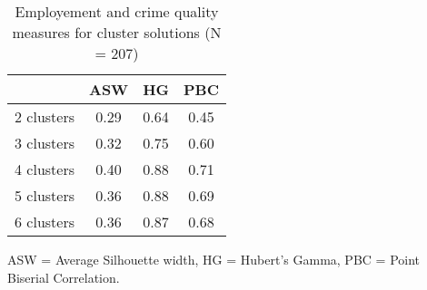 \begin{table}[htp]
\footnotesize
\setlength{\tabcolsep}{35pt}
\renewcommand{\arraystretch}{1.3}
\begin{threeparttable}
\centering
\caption{Employement and crime quality measures for cluster solutions (N = 207)} 
\label{tab:quality_clusters_job_crime}
\begin{tabular}{lccc}
  \hline
 & ASW & HG & PBC \\ 
  \hline
2 clusters & 0.29 & 0.64 & 0.45 \\ 
  3 clusters & 0.32 & 0.75 & 0.60 \\ 
  4 clusters & 0.40 & 0.88 & 0.71 \\ 
  5 clusters & 0.36 & 0.88 & 0.69 \\ 
  6 clusters & 0.36 & 0.87 & 0.68 \\ 
   \hline
\end{tabular}
\begin{tablenotes}
\scriptsize
\item ASW = Average Silhouette width, HG = Hubert's Gamma, PBC = Point Biserial Correlation.
\end{tablenotes}
\end{threeparttable}
\end{table}
